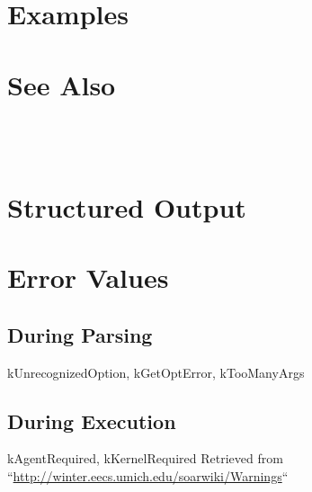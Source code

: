 \documentclass[10pt]{article}
\begin{document}
\section*{ Examples }
\section*{ See Also }


 \\ 



 \\ 

\section*{ Structured Output }
\section*{ Error Values }
\subsection*{ During Parsing }


 kUnrecognizedOption, kGetOptError, kTooManyArgs
\subsection*{ During Execution }


 kAgentRequired, kKernelRequired Retrieved from ``\url{http://winter.eecs.umich.edu/soarwiki/Warnings}``
\end{document}

